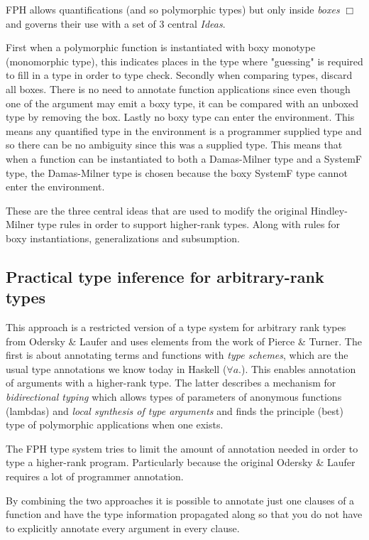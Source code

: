 FPH allows quantifications (and so polymorphic types) but only inside \emph{boxes} $\Box$ and governs their use with a set of 3 central \textit{Ideas}\cite{FPH}.

First when a polymorphic function is instantiated with boxy monotype (monomorphic type), this indicates places in the type where "guessing" is required to fill in a type in order to type check.
Secondly when comparing types, discard all boxes. There is no need to annotate function applications since even though one of the argument may emit a boxy type, it can be compared with an unboxed type by removing the box.
Lastly no boxy type can enter the environment. This means any quantified type in the environment is a programmer supplied type and so there can be no ambiguity since this was a supplied type. This means that when a function can be instantiated to both a Damas-Milner type and a SystemF type, the Damas-Milner type is chosen because the boxy SystemF type cannot enter the environment.

These are the three central ideas that are used to modify the original Hindley-Milner type rules in order to support higher-rank types. Along with rules for boxy instantiations, generalizations and subsumption.

\subsection{Practical type inference for arbitrary-rank types\cite{boring}}
This approach is a restricted version of a type system for arbitrary rank types from Odersky \& Laufer\cite{odesky} and uses elements from the work of Pierce \& Turner\cite{pierce}. The first is about annotating terms and functions with \textit{type schemes}, which are the usual type annotations we know today in Haskell ($\forall a.$). This enables annotation of arguments with a higher-rank type. The latter describes a mechanism for \textit{bidirectional typing} which allows types of parameters of anonymous functions (lambdas) and \textit{local synthesis of type arguments} and finds the principle (best) type of polymorphic applications when one exists.

The FPH type system tries to limit the amount of annotation needed in order to type a higher-rank program. Particularly because the original Odersky \& Laufer\cite{odesky} requires a lot of programmer annotation.

By combining the two approaches it is possible to annotate just one clauses of a function and have the type information propagated along so that you do not have to explicitly annotate every argument in every clause.

